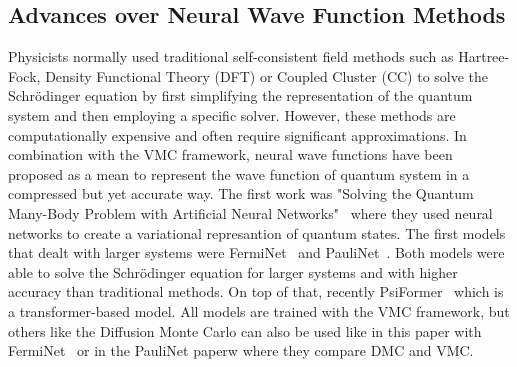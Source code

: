 \documentclass{article}
\begin{document}
\subsection{Advances over Neural Wave Function Methods}
Physicists normally used traditional self-consistent field methods such as Hartree-Fock, Density Functional Theory (DFT) or Coupled Cluster (CC) to solve the Schrödinger equation by first simplifying the representation of the quantum system and then employing a specific solver. However, these methods are computationally expensive and often require significant approximations. In combination with the VMC framework, neural wave functions have been proposed as a mean to represent the wave function of quantum system in a compressed but yet accurate way. The first work was "Solving the Quantum Many-Body Problem with Artificial Neural Networks"~\citep{carleoSolvingQuantumManyBody2017} where they used neural networks to create a variational represantion of quantum states. The first models that dealt with larger systems were FermiNet~\citep{pfauInitioSolutionManyelectron2020} and PauliNet~\citep{hermannDeepneuralnetworkSolutionElectronic2020}. Both models were able to solve the Schrödinger equation for larger systems and with higher accuracy than traditional methods. On top of that, recently PsiFormer~\citep{vonglehn2023selfattentionansatzabinitioquantum} which is a transformer-based model. All models are trained with the VMC framework, but others like the Diffusion Monte Carlo can also be used like in this paper with FermiNet~\cite{wilsonSimulationsStateoftheartFermionic2021} or in the PauliNet paperw where they compare DMC and VMC.
\end{document}
